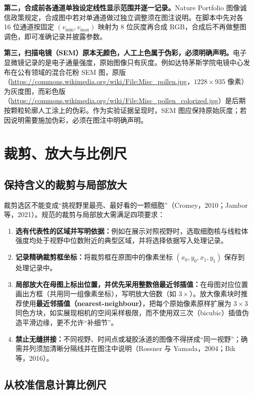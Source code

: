 \textbf{第二，合成前各通道单独设定线性显示范围并逐一记录。}Nature Portfolio 图像诚信政策规定，合成图中若对单通道做过独立调整须在图注说明。在脚本中先对各 16 位通道按固定 $(v_{\min}, v_{\max})$ 映射为 8 位灰度再合成 RGB，合成后不再做整图调色，即可准确记录并披露参数。

\textbf{第三，扫描电镜（SEM）原本无颜色，人工上色属于伪彩，必须明确声明。}电子显微镜记录的是电子通量强度，原始图像只有灰度。例如达特茅斯学院电镜中心发布在公有领域的混合花粉 SEM 图，原版（\url{https://commons.wikimedia.org/wiki/File:Misc_pollen.jpg}，$1228 \times 935$ 像素）为灰度图，而彩色版（\url{https://commons.wikimedia.org/wiki/File:Misc_pollen_colorized.jpg}）是后期按颗粒轮廓人工涂上的伪彩。作为实验证据呈现时，SEM 图应保持原始灰度；若因说明需要施加伪彩，必须在图注中明确声明。

\section{裁剪、放大与比例尺}

\subsection{保持含义的裁剪与局部放大}

裁剪选区不能变成“挑视野里最亮、最好看的一颗细胞”（Cromey，2010；Jambor 等，2021）。规范的裁剪与局部放大需满足四项要求：
\begin{enumerate}
\item \textbf{选有代表性的区域并写明依据：}例如在展示对照视野时，选取细胞核与线粒体强度均处于视野中位数附近的典型区域，并将选择依据写入处理记录。
\item \textbf{记录精确裁剪框坐标：}将裁剪框在原图中的像素坐标 $(x_0, y_0, x_1, y_1)$ 保存到处理记录中。
\item \textbf{局部放大在母图上标出位置，并优先采用整数倍最近邻插值：}在母图对应位置画出方框（共用同一组像素坐标），写明放大倍数（如 $3\times$）。放大像素块时推荐使用\textbf{最近邻插值（nearest-neighbour）}，把每个原始像素原样扩展为 $3 \times 3$ 同色方块，如实展现相机的空间采样极限，而不使用双三次（bicubic）插值伪造平滑边缘，更不允许“补细节”。
\item \textbf{禁止无缝拼接：}不同视野、时间点或凝胶泳道的图像不得拼成“同一视野”；确需并列须加清晰分隔线并在图注中说明（Rossner 与 Yamada，2004；Bik 等，2016）。
\end{enumerate}

\subsection{从校准信息计算比例尺}

